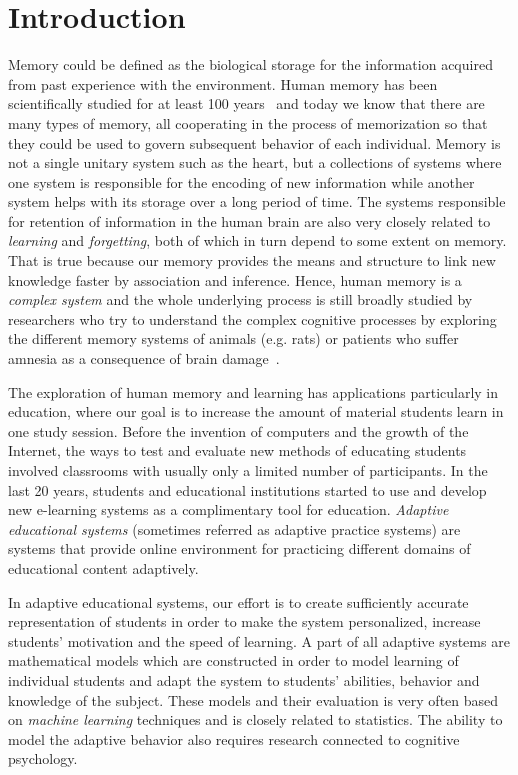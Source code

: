 \chapter{Introduction}

Memory could be defined as the biological storage for the information acquired from past experience with the environment. Human memory has been scientifically studied for at least 100 years~\cite{baddeley1997human} and today we know that there are many types of memory, all cooperating in the process of memorization so that they could be used to govern subsequent behavior of each individual. Memory is not a single unitary system such as the heart, but a collections of systems where one system is responsible for the encoding of new information while another system helps with its storage over a long period of time. The systems responsible for retention of information in the human brain are also very closely related to \textit{learning} and \textit{forgetting}, both of which in turn depend to some extent on memory. That is true because our memory provides the means and structure to link new knowledge faster by association and inference. Hence, human memory is a \textit{complex system} and the whole underlying process is still broadly studied by researchers who try to understand the complex cognitive processes by exploring the different memory systems of animals (e.g. rats) or patients who suffer amnesia as a consequence of brain damage~\cite{mcclelland1995there}.

The exploration of human memory and learning has applications particularly in education, where our goal is to increase the amount of material students learn in one study session. Before the invention of computers and the growth of the Internet, the ways to test and evaluate new methods of educating students involved classrooms with usually only a limited number of participants. In the last 20 years, students and educational institutions started to use and develop new e-learning systems as a complimentary tool for education. \textit{Adaptive educational systems} (sometimes referred as adaptive practice systems) are systems that provide online environment for practicing different domains of educational content adaptively.

In adaptive educational systems, our effort is to create sufficiently accurate representation of students in order to make the system personalized, increase students' motivation and the speed of learning. A part of all adaptive systems are mathematical models which are constructed in order to model learning of individual students and adapt the system to students' abilities, behavior and knowledge of the subject. These models and their evaluation is very often based on \textit{machine learning} techniques and is closely related to statistics. The ability to model the adaptive behavior also requires research connected to cognitive psychology.

